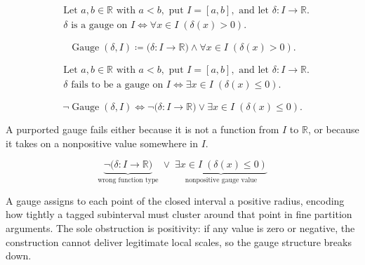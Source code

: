 \begin{remark*}
\[
\begin{aligned}
&\text{Let } a,b\in\mathbb{R} \text{ with } a<b, \text{ put } I=[a,b], \text{ and let } \delta:I\to\mathbb{R}.\\
&\delta \text{ is a gauge on } I \Longleftrightarrow \forall x\in I\;(\delta(x)>0).
\end{aligned}
\]
\end{remark*}

\begin{remark*}
\[
\operatorname{Gauge}(\delta,I)
\coloneqq
\bigl(\delta:I\to\mathbb{R}\bigr)
\land
\forall x\in I\;(\delta(x)>0).
\]
\end{remark*}

\begin{remark*}
\[
\begin{aligned}
&\text{Let } a,b\in\mathbb{R} \text{ with } a<b, \text{ put } I=[a,b], \text{ and let } \delta:I\to\mathbb{R}.\\
&\delta \text{ fails to be a gauge on } I \Longleftrightarrow \exists x\in I\;(\delta(x)\le 0).
\end{aligned}
\]
\end{remark*}

\begin{remark*}
\[
\neg\operatorname{Gauge}(\delta,I)
\Longleftrightarrow
\neg\bigl(\delta:I\to\mathbb{R}\bigr)
\lor
\exists x\in I\;(\delta(x)\le 0).
\]
\end{remark*}

\begin{remark*}
A purported gauge fails either because it is not a function from $I$ to
\(\mathbb{R}\), or because it takes on a nonpositive value somewhere in
$I$.
\end{remark*}

\begin{remark*}
\[
\underbrace{\neg\bigl(\delta:I\to\mathbb{R}\bigr)}_{\text{wrong function type}}
\;\lor\;
\underbrace{\exists x\in I\;(\delta(x)\le 0)}_{\text{nonpositive gauge value}}
\]
\end{remark*}

\begin{remark*}[Interpretation]
A gauge assigns to each point of the closed interval a positive radius, encoding how tightly a tagged subinterval must cluster around that point in fine partition arguments. The sole obstruction is positivity: if any value is zero or negative, the construction cannot deliver legitimate local scales, so the gauge structure breaks down.
\end{remark*}

